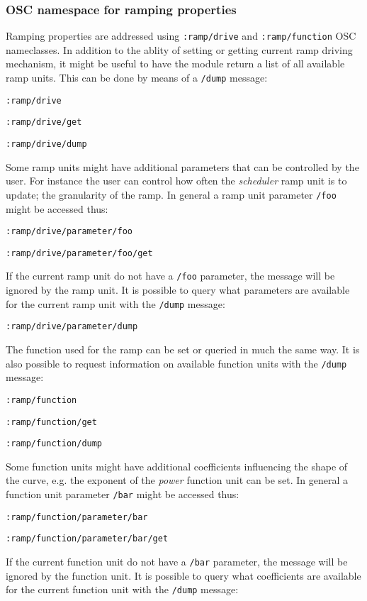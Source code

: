 \documentclass{sig-alternate}
\begin{document}
\subsubsection{OSC namespace for ramping properties} %
\label{ssub:osc_namespace_for_ramping_properties}

Ramping properties are addressed using \texttt{:ramp/drive} and \texttt{:ramp/function} OSC nameclasses. In addition to the ablity of setting or getting current ramp driving mechanism, it might be useful to have the module return a list of all available ramp units. This can be done by means of a \texttt{/dump} message:

\texttt{:ramp/drive}

\texttt{:ramp/drive/get}

\texttt{:ramp/drive/dump}

Some ramp units might have additional parameters that can be controlled by the user. For instance the user can control how often the \emph{scheduler} ramp unit is to update; the granularity of the ramp.  In general a ramp unit parameter \texttt{/foo} might be accessed thus:


\texttt{:ramp/drive/parameter/foo}

\texttt{:ramp/drive/parameter/foo/get}

If the current ramp unit do not have a \texttt{/foo} parameter, the message will be ignored by the ramp unit. It is possible to query what parameters are available for the current ramp unit with the \texttt{/dump} message:

\texttt{:ramp/drive/parameter/dump}

The function used for the ramp can be set or queried in much the same way. It is also possible to request information on available function units with the \texttt{/dump} message:

\texttt{:ramp/function}

\texttt{:ramp/function/get}

\texttt{:ramp/function/dump}

Some function units might have additional coefficients influencing the shape of the curve, e.g. the exponent of the \emph{power} function unit can be set. In general a function unit parameter \texttt{/bar} might be accessed thus:

\texttt{:ramp/function/parameter/bar}

\texttt{:ramp/function/parameter/bar/get}

If the current function unit do not have a \texttt{/bar} parameter, the message will be ignored by the function unit. It is possible to query what coefficients are available for the current function unit with the \texttt{/dump} message:
\end{document}
